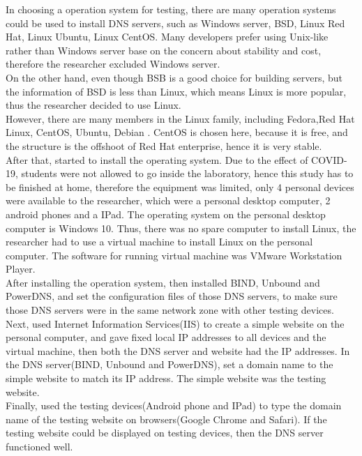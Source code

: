 \documentclass[conference]{IEEEtran}
\begin{document}
In choosing a operation system for testing, there are many operation systems could be used to install DNS servers, such as Windows server, BSD, Linux Red Hat, Linux Ubuntu, Linux CentOS. Many developers prefer using Unix-like rather than Windows server base on the concern about stability and cost, therefore the researcher excluded Windows server.
\\

On the other hand, even though BSB is a good choice for building servers, but the information of BSD is less than Linux, which means Linux is more popular, thus the researcher decided to use Linux.
\\

However, there are many members in the Linux family, including Fedora,Red Hat Linux, CentOS, Ubuntu, Debian \cite{Linux_distributions}. CentOS is chosen here, because it is free, and the structure is the offshoot of Red Hat enterprise, hence it is very stable. 
\\

After that, started to install the operating system. Due to the effect of COVID-19, students were not allowed to go inside the laboratory, hence this study has to be finished at home, therefore the equipment was limited, only 4 personal devices were available to the researcher, which were a personal desktop computer, 2 android phones and a IPad. The operating system on the personal desktop computer is Windows 10. Thus, there was no spare computer to install Linux, the researcher had to use a virtual machine to install Linux on the personal computer. The software for running virtual machine was VMware Workstation Player.
\\

After installing the operation system, then installed BIND, Unbound and PowerDNS, and set the configuration files of those DNS servers, to make sure those DNS servers were in the same network zone with other testing devices.
\\

Next, used Internet Information Services(IIS) to create a simple website on the personal computer, and gave fixed local IP addresses to all devices and the virtual machine, then both the DNS server and website had the IP addresses. In the DNS server(BIND, Unbound and PowerDNS), set a domain name to the simple website to match its IP address. The simple website was the testing website.
\\

Finally, used the testing devices(Android phone and IPad) to type the domain name of the testing website on browsers(Google Chrome and Safari). If the testing website could be displayed on testing devices, then the DNS server functioned well. \\
\end{document}
